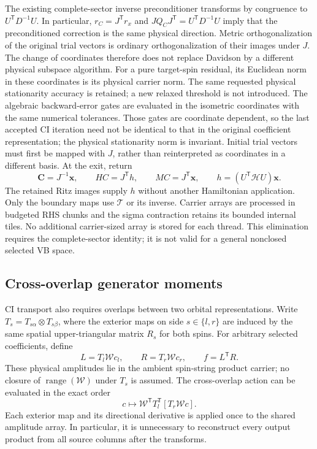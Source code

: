 \documentclass[11pt,a4paper]{article}
\newcommand{\Tr}{^{\mathsf T}}
\newcommand{\Wa}{\mathcal W}
\newcommand{\Ta}{\mathcal T}
\newcommand{\Ha}{\mathcal H}
\renewcommand{\vv}[1]{\mathbf{#1}}
\begin{document}
The existing complete-sector inverse preconditioner transforms by congruence
to $U\Tr D^{-1}U$. In particular, $r_C=J\Tr r_x$ and
$JQ_CJ\Tr=U\Tr D^{-1}U$ imply that the preconditioned correction is the
same physical direction. Metric orthogonalization of the original trial
vectors is ordinary orthogonalization of their images under $J$. The change
of coordinates therefore does not replace Davidson by a different physical
subspace algorithm. For a pure target-spin residual, its Euclidean norm in
these coordinates is its physical carrier norm. The same requested physical
stationarity accuracy is retained; a new relaxed threshold is not introduced.
The algebraic backward-error gates are evaluated in the isometric coordinates
with the same numerical tolerances. Those gates are coordinate dependent, so
the last accepted CI iteration need not be identical to that in the original
coefficient representation; the physical stationarity norm is invariant.
Initial trial vectors must first be mapped with $J$, rather than reinterpreted
as coordinates in a different basis. At the exit, return
\begin{equation}
 \vv C=J^{-1}\vv x,\qquad HC=J\Tr h,\qquad MC=J\Tr\vv x,
 \qquad h=(U\Tr\Ha U)\vv x.
\end{equation}
The retained Ritz images supply $h$ without another Hamiltonian application.
Only the boundary maps use $\Ta$ or its inverse. Carrier arrays are processed
in budgeted RHS chunks and the sigma contraction retains its bounded internal
tiles. No additional carrier-sized array is stored for each thread. This
elimination requires the complete-sector identity; it is not valid for a
general nonclosed selected VB space.

\subsection{Cross-overlap generator moments}
\label{sec:cross-moments}

CI transport also requires overlaps between two orbital representations.
Write $T_s=T_{s\alpha}\otimes T_{s\beta}$, where the exterior maps on
side $s\in\{l,r\}$ are induced by the same spatial upper-triangular
matrix $R_s$ for both spins. For arbitrary selected coefficients, define
\begin{equation}
 L=T_l\Wa c_l,\qquad R=T_r\Wa c_r,\qquad
 f=L\Tr R.
\end{equation}
These physical amplitudes lie in the ambient spin-string product carrier;
no closure of $\operatorname{range}(\Wa)$ under $T_s$ is assumed.
The cross-overlap action can be evaluated in the exact order
\begin{equation}
 c\longmapsto\Wa\Tr T_l\Tr[T_r\Wa c].
 \label{eq:cross-direct}
\end{equation}
Each exterior map and its directional derivative is applied once to the
shared amplitude array. In particular, it is unnecessary to reconstruct
every output product from all source columns after the transforms.
\end{document}
